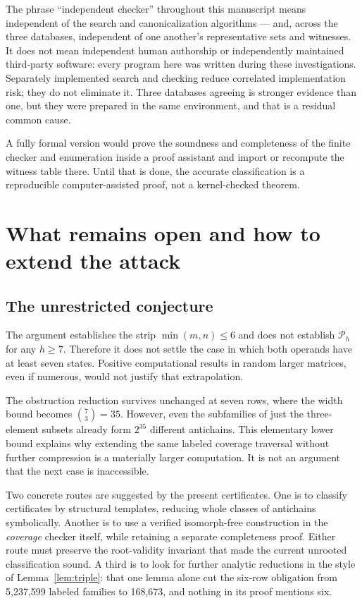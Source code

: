 \documentclass[11pt,letterpaper]{article}
\numberwithin{equation}{section}
\theoremstyle{definition}
\theoremstyle{remark}
\begin{document}
The phrase ``independent checker'' throughout this manuscript means
independent of the search and canonicalization algorithms --- and, across the
three databases, independent of one another's representative sets and
witnesses. It does not mean independent human authorship or independently
maintained third-party software: every program here was written during these
investigations. Separately implemented search and checking reduce correlated
implementation risk; they do not eliminate it. Three databases agreeing is
stronger evidence than one, but they were prepared in the same environment,
and that is a residual common cause.

A fully formal version would prove the soundness and completeness of the
finite checker and enumeration inside a proof assistant and import or
recompute the witness table there. Until that is done, the accurate
classification is a reproducible computer-assisted proof, not a
kernel-checked theorem.

\section{What remains open and how to extend the attack}
\label{sec:limits}

\subsection{The unrestricted conjecture}
The argument establishes the strip $\min(m,n)\le6$ and does not establish
$\mathcal P_h$ for any $h\ge7$. Therefore it does not settle the case in
which both operands have at least seven states. Positive computational
results in random larger matrices, even if numerous, would not justify
that extrapolation.

The obstruction reduction survives unchanged at seven rows, where the
width bound becomes $\binom73=35$. However, even the subfamilies of just
the three-element subsets already form $2^{35}$ different antichains.
This elementary lower bound explains why extending the same labeled
coverage traversal without further compression is a materially larger
computation. It is not an argument that the next case is inaccessible.

Two concrete routes are suggested by the present certificates. One is to
classify certificates by structural templates, reducing whole classes of
antichains symbolically. Another is to use a verified isomorph-free
construction in the \emph{coverage} checker itself, while retaining a
separate completeness proof. Either route must preserve the root-validity
invariant that made the current unrooted classification sound. A third is
to look for further analytic reductions in the style of
Lemma~\ref{lem:triple}: that one lemma alone cut the six-row obligation from
5,237,599 labeled families to 168,673, and nothing in its proof mentions six.
\end{document}

